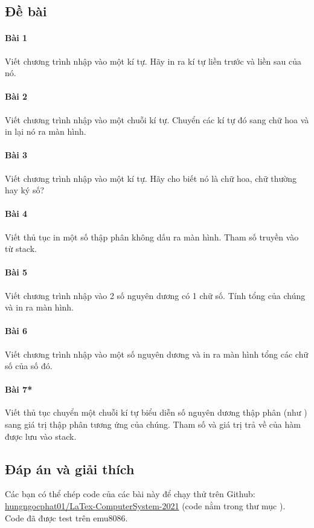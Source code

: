 \documentclass[main.tex]{subfiles}
\begin{document}
\subsection{Đề bài}
\paragraph{Bài 1} Viết chương trình nhập vào một kí tự. Hãy in ra kí tự liền trước và liền sau của nó.
\paragraph{Bài 2} Viết chương trình nhập vào một chuỗi kí tự. Chuyển các kí tự đó sang chữ hoa và in lại nó ra màn hình.
\paragraph{Bài 3} Viết chương trình nhập vào một kí tự. Hãy cho biết nó là chữ hoa, chữ thường hay ký số?
\paragraph{Bài 4} Viết thủ tục in một số thập phân không dấu ra màn hình. Tham số truyền vào từ stack.
\paragraph{Bài 5} Viết chương trình nhập vào 2 số nguyên dương có 1 chữ số. Tính tổng của chúng và in ra màn hình.
\paragraph{Bài 6} Viết chương trình nhập vào một số nguyên dương và in ra màn hình tổng các chữ số của số đó.
\paragraph{Bài 7*} Viết thủ tục chuyển một chuỗi kí tự biểu diễn số nguyên dương thập phân (như ) sang giá trị thập phân tương ứng của chúng. Tham số và giá trị trả về của hàm được lưu vào stack.
\pagebreak

\subsection{Đáp án và giải thích}
Các bạn có thể chép code của các bài này để chạy thử trên Github: \href{https://github.com/hungngocphat01/LaTex-ComputerSystem-2021}{hungngocphat01/LaTex-ComputerSystem-2021} (code nằm trong thư mục ).\\
Code đã được test trên emu8086.
\renewcommand{\fcolorbox}[4][]{#4}
\end{document}
